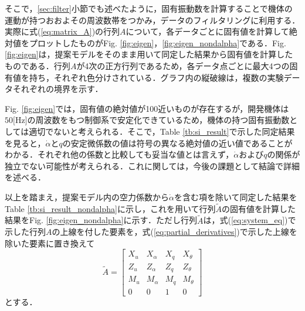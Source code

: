 

そこで，\ref{sec:filter}小節でも述べたように，固有振動数を計算することで機体の運動が持つおおよその周波数帯をつかみ，データのフィルタリングに利用する．実際に式(\ref{eq:matrix_A})の行列$A$について，各データごとに固有値を計算して絶対値をプロットしたものがFig. \ref{fig:eigen}，\ref{fig:eigen_nondalpha}である．Fig. \ref{fig:eigen}は，提案モデルをそのまま用いて同定した結果から固有値を計算したものである．行列$A$が4次の正方行列であるため，各データ点ごとに最大4つの固有値を持ち，それぞれ色分けされている．グラフ内の縦破線は，複数の実験データそれぞれの境界を示す．

Fig. \ref{fig:eigen}では，固有値の絶対値が100近いものが存在するが，開発機体は$50\mbox{[Hz]}$の周波数をもつ制御系で安定化できているため，機体の持つ固有振動数としては適切でないと考えられる．そこで，Table \ref{tb:si_result}で示した同定結果を見ると，$\dot{\alpha}$と$q$の安定微係数の値は符号の異なる絶対値の近い値であることがわかる．それぞれ他の係数と比較しても妥当な値とは言えず，$\dot{\alpha}$および$q$の関係が独立でない可能性が考えられる．これに関しては，今後の課題として結論で詳細を述べる．

以上を踏まえ，提案モデル内の空力係数から$\dot{\alpha}$を含む項を除いて同定した結果をTable \ref{tb:si_result_nondalpha}に示し，これを用いて行列$\tilde{A}$の固有値を計算した結果をFig. \ref{fig:eigen_nondalpha}に示す．ただし行列$\tilde{A}$は，式(\ref{eq:system_eq})で示した行列$A$の上線を付した要素を，式(\ref{eq:partial_derivatives})で示した上線を除いた要素に置き換えて
\begin{equation}
  \tilde{A} =
  \left[
  \begin{array}{cccc}
    X_u & X_\alpha & X_q & X_\theta \\
    Z_u & Z_\alpha & Z_q & Z_\theta \\
    M_u & M_\alpha & M_q & M_\theta \\
    0 & 0 & 1 & 0
  \end{array}
  \right]
\end{equation}
とする．

